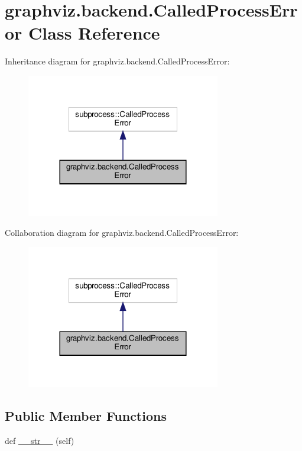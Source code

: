 \hypertarget{classgraphviz_1_1backend_1_1CalledProcessError}{}\section{graphviz.\+backend.\+Called\+Process\+Error Class Reference}
\label{classgraphviz_1_1backend_1_1CalledProcessError}


Inheritance diagram for graphviz.\+backend.\+Called\+Process\+Error\+:
\nopagebreak
\begin{figure}[H]
\begin{center}
\leavevmode
\includegraphics[width=240pt]{classgraphviz_1_1backend_1_1CalledProcessError__inherit__graph}
\end{center}
\end{figure}


Collaboration diagram for graphviz.\+backend.\+Called\+Process\+Error\+:
\nopagebreak
\begin{figure}[H]
\begin{center}
\leavevmode
\includegraphics[width=240pt]{classgraphviz_1_1backend_1_1CalledProcessError__coll__graph}
\end{center}
\end{figure}
\subsection*{Public Member Functions}
\begin{DoxyCompactItemize}
\item 
def \hyperlink{classgraphviz_1_1backend_1_1CalledProcessError_a10f4556ed0f6b654b097a6059687ce5c}{\+\_\+\+\_\+str\+\_\+\+\_\+} (self)
\end{DoxyCompactItemize}


